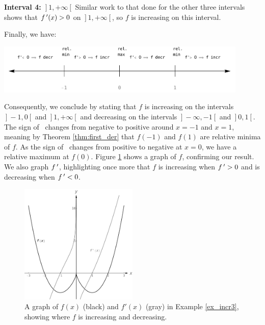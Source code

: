 \begin{example}
\begin{description}
\item \textbf{Interval 4:  $\left.\right]1,+\infty\left[\right.$} Similar work to that done for the other three intervals shows that $f\,'(x)>0$ on $\left.\right]1,+\infty\left[\right.$, so $f$ is increasing on this interval.
\end{description}
Finally, we have:
\begin{center}
			\includegraphics[width=0.9\textwidth]{fig_behaviour_14}
	\end{center}
	
Consequently, we conclude by stating that $f$ is increasing on the intervals $\left.\right]-1,0\left[\right.$ and $\left.\right]1,+\infty\left[\right.$ and decreasing on the intervals $\left.\right]-\infty,-1\left[\right.$ and $\left.\right]0,1\left[\right.$. The sign of \fp\ changes from negative to positive around $x=-1$ and $x=1$, meaning by Theorem \ref{thm:first_der} that $f(-1)$ and $f(1)$ are relative minima of $f$. As the sign of \fp\ changes from positive to negative at $x=0$, we have a relative maximum at $f(0)$. Figure \ref{fig_behaviour_15} shows a graph of $f$, confirming our result. We also graph $f\,'$, highlighting once more that $f$ is increasing when $f\,'>0$ and is decreasing when $f\,'<0$.

\begin{figure}[H]
	\begin{center}
			\includegraphics[width=0.5\textwidth]{fig_behaviour_15}
	\caption{A graph of $f(x)$ (black)  and $f'(x)$ (gray) in Example \ref{ex_incr3}, showing where $f$ is increasing and decreasing.}
	\label{fig_behaviour_15}
	\end{center}
\end{figure}

\end{example}

